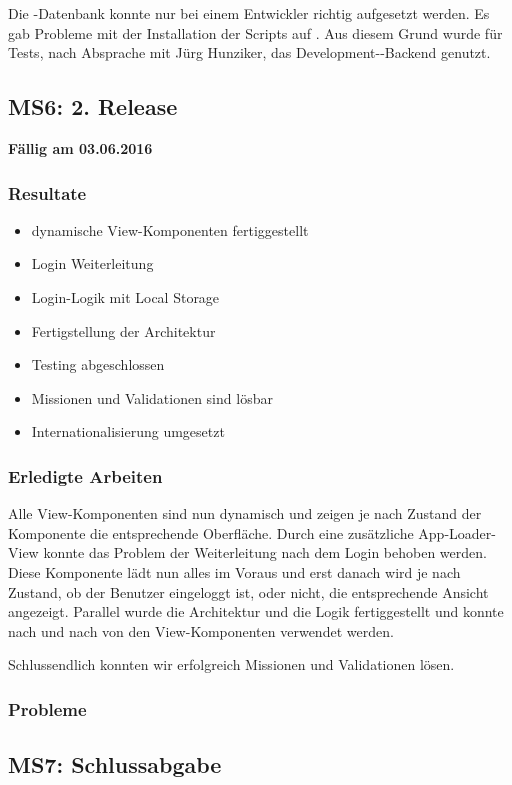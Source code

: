 Die \kort{}-Datenbank konnte nur bei einem Entwickler richtig aufgesetzt werden. 
Es gab Probleme mit der Installation der Scripts auf .
Aus diesem Grund wurde für Tests, nach Absprache mit Jürg Hunziker, das Development-\kort{}-Backend genutzt.

\subsection{MS6: 2. Release}
\label{pm-ms6}
\textbf{Fällig am 03.06.2016}
\subsubsection{Resultate}
\begin{itemize}
	\item dynamische View-Komponenten fertiggestellt
	\item Login Weiterleitung
	\item Login-Logik mit Local Storage
	\item Fertigstellung der Architektur
	\item Testing abgeschlossen
	\item Missionen und Validationen sind lösbar
	\item Internationalisierung umgesetzt
\end{itemize}

\subsubsection{Erledigte Arbeiten}
Alle View-Komponenten sind nun dynamisch und zeigen je nach Zustand der Komponente die entsprechende Oberfläche.
Durch eine zusätzliche App-Loader-View konnte das Problem der Weiterleitung nach dem Login behoben werden.
Diese Komponente lädt nun alles im Voraus und erst danach wird je nach Zustand, ob der Benutzer eingeloggt ist, oder nicht, die entsprechende Ansicht angezeigt.
Parallel wurde die Architektur und die Logik fertiggestellt und konnte nach und nach von den View-Komponenten verwendet werden.

Schlussendlich konnten wir erfolgreich Missionen und Validationen lösen.

\subsubsection{Probleme}


\subsection{MS7: Schlussabgabe}
\label{pm-ms7}

